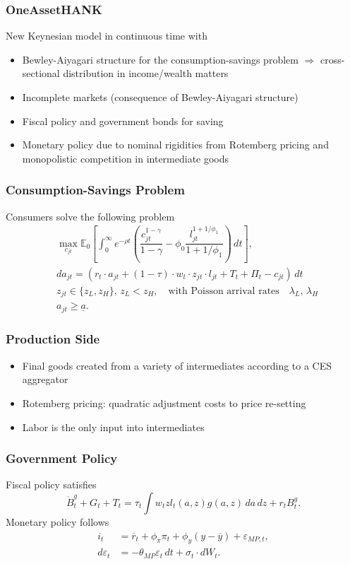 \documentclass{beamer}
\newcommand{\E}{\mathbb{E}}
\newcommand{\RA}{\Rightarrow}
\begin{document}
\begin{frame}
  \frametitle{OneAssetHANK}
  New Keynesian model in continuous time with
  \begin{itemize}
  \item Bewley-Aiyagari structure for the consumption-savings problem $\RA$ cross-sectional distribution in income/wealth matters
  \item Incomplete markets (consequence of Bewley-Aiyagari structure)
  \item Fiscal policy and government bonds for saving
  \item Monetary policy due to nominal rigidities from Rotemberg pricing and monopolistic competition in intermediate goods
  \end{itemize}
\end{frame}

\begin{frame}
  \frametitle{Consumption-Savings Problem}
Consumers solve the following problem
\begin{align*}
&\max_{c_{jt}}\E_0\left[\int_0^\infty e^{-\rho t}\left( \dfrac{c_{jt}^{1-\gamma}}{1-\gamma} - \phi_0\dfrac{l_{jt}^{1+1/\phi_1}}{1+1/\phi_1}\right)\,dt\right],  \\
& da_{jt} = (r_t\cdot a_{jt}+ (1-\tau)\cdot w_t\cdot z_{jt}\cdot l_{jt} + T_t + \Pi_t - c_{jt})\,dt\\
&z_{jt}\in \{z_L, z_H\},\, z_L< z_H,\quad\text{with Poisson arrival rates}\quad \lambda_L, \, \lambda_H\\
& a_{jt}\geq \underline{a}.
\end{align*}
\end{frame}
\begin{frame}
  \frametitle{Production Side}
\begin{itemize}
\item Final goods created from a variety of intermediates according to a CES aggregator
\item Rotemberg pricing: quadratic adjustment costs to price re-setting
\item Labor is the only input into intermediates
\end{itemize}
\end{frame}
\begin{frame}
  \frametitle{Government Policy}
  Fiscal policy satisfies
\[\dot{B}_t^g + G_t + T_t = \tau_t\int w_tzl_t(a,z)g(a,z)\,da\,dz+r_tB_t^g.  \]
Monetary policy follows
\begin{align*}
 i_t& = \overline{r}_t + \phi_\pi\pi_t + \phi_y(y - \overline{y}) + \varepsilon_{MP,t},\\
 d\varepsilon_t &= -\theta_{MP}\varepsilon_t\,dt + \sigma_t\cdot dW_t.
\end{align*}
\end{frame}
\end{document}
